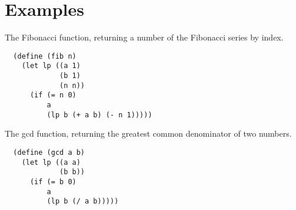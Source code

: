 \documentclass[a4paper, 11pt]{article}
\begin{document}
\section{Examples}

The Fibonacci function, returning a number of the Fibonacci series by
index.

\begin{lstlisting}
  (define (fib n)
    (let lp ((a 1)
             (b 1)
             (n n))
      (if (= n 0)
          a
          (lp b (+ a b) (- n 1)))))
\end{lstlisting}

The gcd function, returning the greatest common denominator of two
numbers.

\begin{lstlisting}
  (define (gcd a b)
    (let lp ((a a)
             (b b))
      (if (= b 0)
          a
          (lp b (/ a b)))))
\end{lstlisting}
\end{document}
